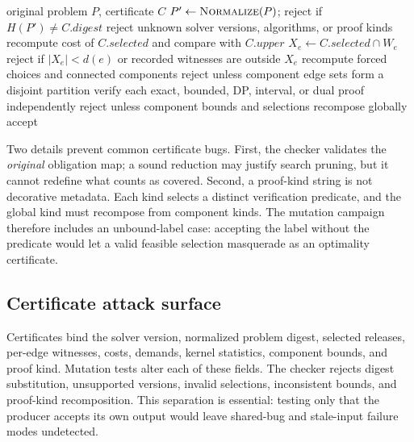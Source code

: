 \documentclass[10pt,conference]{IEEEtran}
\begin{document}
\begin{algorithm}[t]
\caption{Independent certificate replay}
\label{alg:check}
\begin{algorithmic}[1]
\Require original problem $P$, certificate $C$
\State $P'\gets\textsc{Normalize}(P)$; reject if $H(P')\neq C.\mathit{digest}$
\State reject unknown solver versions, algorithms, or proof kinds
\State recompute cost of $C.\mathit{selected}$ and compare with $C.\mathit{upper}$
  \State $X_e\gets C.\mathit{selected}\cap W_e$
  \State reject if $|X_e|<d(e)$ or recorded witnesses are outside $X_e$
\EndFor
\State recompute forced choices and connected components
\State reject unless component edge sets form a disjoint partition
\State verify each exact, bounded, DP, interval, or dual proof independently
\State reject unless component bounds and selections recompose globally
\State \Return accept
\end{algorithmic}
\end{algorithm}

Two details prevent common certificate bugs. First, the checker validates the \emph{original} obligation map; a sound reduction may justify search pruning, but it cannot redefine what counts as covered. Second, a proof-kind string is not decorative metadata. Each kind selects a distinct verification predicate, and the global kind must recompose from component kinds. The mutation campaign therefore includes an unbound-label case: accepting the label without the predicate would let a valid feasible selection masquerade as an optimality certificate.

\subsection{Certificate attack surface}
Certificates bind the solver version, normalized problem digest, selected releases, per-edge witnesses, costs, demands, kernel statistics, component bounds, and proof kind. Mutation tests alter each of these fields. The checker rejects digest substitution, unsupported versions, invalid selections, inconsistent bounds, and proof-kind recomposition. This separation is essential: testing only that the producer accepts its own output would leave shared-bug and stale-input failure modes undetected.
\end{document}
